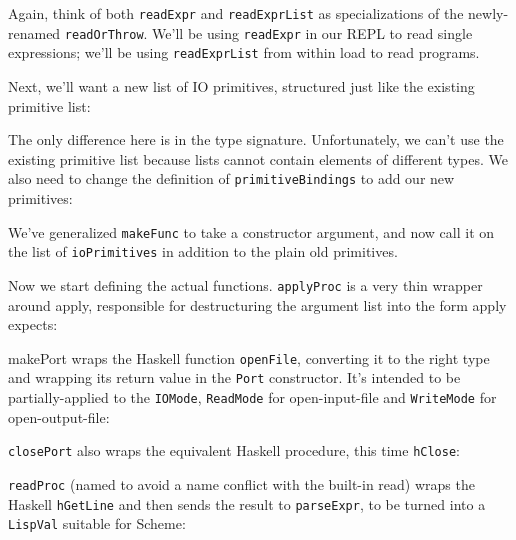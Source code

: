  
Again, think of both \verb|readExpr| and \verb|readExprList| as specializations of the newly-renamed \verb|readOrThrow|. We'll be using \verb|readExpr| in our REPL to read single expressions; we'll be using \verb|readExprList| from within load to read programs.
 
Next, we'll want a new list of IO primitives, structured just like the existing primitive list:
 
 
The only difference here is in the type signature. Unfortunately, we can't use the existing primitive list because lists cannot contain elements of different types. We also need to change the definition of \verb|primitiveBindings| to add our new primitives:
 
 
We've generalized \verb|makeFunc| to take a constructor argument, and now call it on the list of \verb|ioPrimitives| in addition to the plain old primitives.
 
Now we start defining the actual functions. \verb|applyProc| is a very thin wrapper around apply, responsible for destructuring the argument list into the form apply expects:
 
 
makePort wraps the Haskell function \verb|openFile|, converting it to the right type and wrapping its return value in the \verb|Port| constructor. It's intended to be partially-applied to the \verb|IOMode|, \verb|ReadMode| for open-input-file and \verb|WriteMode| for open-output-file:
 
 
\verb|closePort| also wraps the equivalent Haskell procedure, this time \verb|hClose|:
 
 
\verb|readProc| (named to avoid a name conflict with the built-in read) wraps the Haskell \verb|hGetLine| and then sends the result to \verb|parseExpr|, to be turned into a \verb|LispVal| suitable for Scheme:
 
